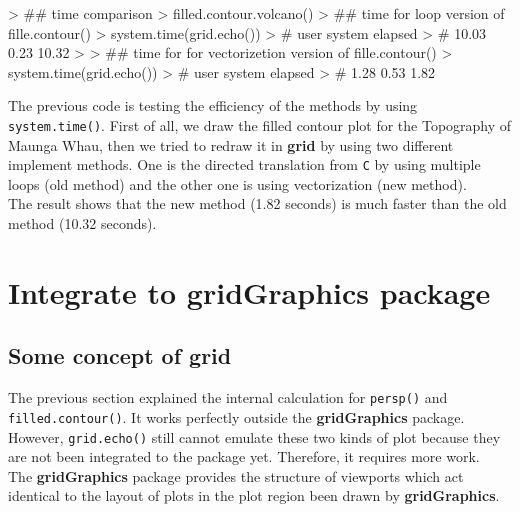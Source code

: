 \documentclass{report}
\begin{document}
\begin{Schunk}
\begin{Sinput}
> ## time comparison
> filled.contour.volcano()
> ## time for loop version of fille.contour()
> system.time(grid.echo())
> # user  system elapsed 
> # 10.03    0.23   10.32 
> 
> ## time for for vectorizetion version of fille.contour()
> system.time(grid.echo())
> # user  system elapsed 
> # 1.28    0.53    1.82 
\end{Sinput}
\end{Schunk}


	The previous code is testing the efficiency of the methods by using \texttt{system.time()}. First of all, we draw the filled contour plot for the Topography of Maunga Whau, then we tried to redraw it in \textbf{grid} by using two different implement methods. One is the directed translation from \texttt{C} by using multiple loops (old method) and the other one is using vectorization (new method).\\
	The result shows that the new method (1.82 seconds) is much faster than the old method (10.32 seconds).

\chapter{Integrate to \textbf{gridGraphics} package}
\section{Some concept of \textbf{grid}}
The previous section explained the internal calculation for \texttt{persp()} and \texttt{filled.contour()}. It works perfectly outside the \textbf{gridGraphics} package. However, \texttt{grid.echo()} still cannot emulate these two kinds of plot because they are not been integrated to the package yet. Therefore, it requires more work.\\ 

The \textbf{gridGraphics} package provides the structure of viewports which act identical to the layout of plots in the plot region been drawn by \textbf{gridGraphics}. 
\end{document}
